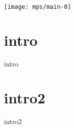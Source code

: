 \documentclass[a4paper, 10 pt]{memoir}
\begin{document}
   \makesongtitle
   \texttt{[image: mps/main-0]}
   
   \section*{intro}
      {intro}

      \section*{intro2}

   {intro2}
\end{document}

